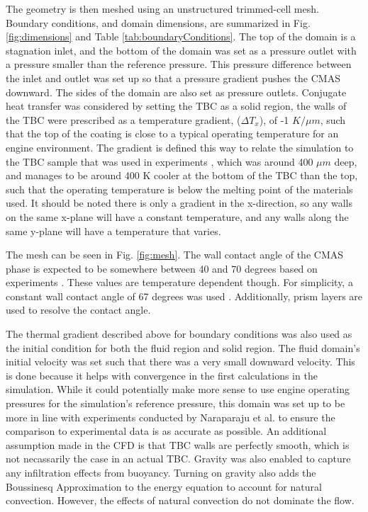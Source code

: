 \documentclass[%
 aip,
 amsmath,amssymb,
 reprint,%
]{revtex4-1}
\begin{document}
The geometry is then meshed using an unstructured trimmed-cell mesh. 
Boundary conditions, and domain dimensions, are summarized in Fig. \ref{fig:dimensions} and Table \ref{tab:boundaryConditions}. The top of the domain is a stagnation inlet, and the bottom of the domain was set as a pressure outlet with a pressure smaller than the reference pressure. This pressure difference between the inlet and outlet was set up so that a pressure gradient pushes the CMAS downward. The sides of the domain are also set as pressure outlets. Conjugate heat transfer was considered by setting the TBC as a solid region, the walls of the TBC were prescribed as a temperature gradient, ($\Delta T_{x}$), of -1 $K/\mu m$, such that the top of the coating is close to a typical operating temperature for an engine environment. The gradient is defined this way to relate the simulation to the TBC sample that was used in experiments \cite{Naraparaju2019}, which was around 400 $\mu m$ deep, and manages to be around 400 K cooler at the bottom of the TBC than the top, such that the operating temperature is below the melting point of the materials used. It should be noted there is only a gradient in the x-direction, so any walls on the same x-plane will have a constant temperature, and any walls along the same y-plane will have a temperature that varies. 

The mesh can be seen in Fig. \ref{fig:mesh}. The wall contact angle of the CMAS phase is expected to be somewhere between 40 and 70 degrees based on experiments \cite{Naraparaju2019}. 
These values are temperature dependent though. For simplicity, a constant wall contact angle of 67 degrees was used \cite{Naraparaju2019}.  Additionally, prism layers are used to resolve the contact angle. 

The thermal gradient described above for boundary conditions was also used as the initial condition for both the fluid region and solid region. The fluid domain's initial velocity was set such that there was a very small downward velocity. This is done because it helps with convergence in the first calculations in the simulation. While it could potentially make more sense to use engine operating pressures for the simulation's reference pressure, this domain was set up to be more in line with experiments conducted by Naraparaju et al. \cite{Naraparaju2014, Naraparaju2017, Naraparaju2019} to ensure the comparison to experimental data is as accurate as possible. An additional assumption made in the CFD is that TBC walls are perfectly smooth, which is not necassarily the case in an actual TBC.  Gravity was also enabled to capture any infiltration effects from buoyancy. Turning on gravity also adds the Boussinesq Approximation to the energy equation to account for natural convection. However, the effects of natural convection do not dominate the flow. 
\end{document}
